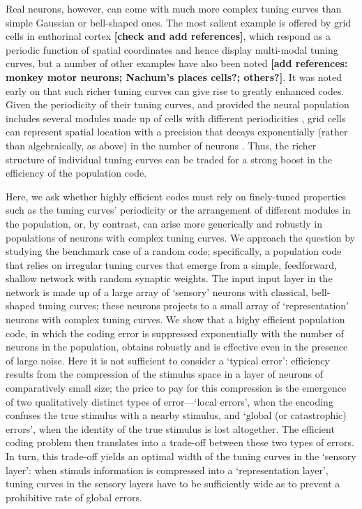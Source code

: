 \documentclass[a4paper]{article}%
\begin{document}
Real neurons, however, can come with much more complex tuning curves than
simple Gaussian or bell-shaped ones. The most salient example is offered by
grid cells in enthorinal cortex
\cite{Hafting2005MicrostructureCortex,Killian2012ACortex} \textbf{[check and
add references]}, which respond as a periodic function of spatial coordinates
and hence display multi-modal tuning curves, but a number of other examples
have also been noted \textbf{[add references: monkey motor neurons; Nachum's
places cells?; others?]}. It was noted early on that such richer tuning curves
can give rise to greatly enhanced codes. Given the periodicity of their tuning
curves, and provided the neural population includes several modules made up of
cells with different periodicities \cite{Fiete2008WhatLocation,Wei2015ACells},
grid cells can represent spatial location with a precision that decays
exponentially (rather than algebraically, as above) in the number of neurons
\cite{Sreenivasan2011GridComputation,Mathis2012ResolutionNeurons}. Thus, the
richer structure of individual tuning curves can be traded for a strong boost
in the efficiency of the population code.

Here, we ask whether highly efficient codes must rely on finely-tuned
properties such as the tuning curves' periodicity or the arrangement of
different modules in the population, or, by contrast, can arise more
generically and robustly in populations of neurons with complex tuning curves.
We approach the question by studying the benchmark case of a random code;
specifically, a population code that relies on irregular tuning curves that
emerge from a simple, feedforward, shallow network with random synaptic
weights. The input input layer in the network is made up of a large array of
`sensory' neurons with classical, bell-shaped tuning curves; these neurons
projects to a small array of `representation' neurons with complex tuning
curves. We show that a highy efficient population code, in which the coding
error is suppressed exponentially with the number of neurons in the
population, obtains robustly and is effective even in the presence of large
noise. Here it is not sufficient to consider a `typical error': efficiency
results from the compression of the stimulus space in a layer of neurons of
comparatively small size; the price to pay for this compression is the
emergence of two qualitatively distinct types of error---`local errors', when
the encoding confuses the true stimulus with a nearby stimulus, and `global
(or catastrophic) errors', when the identity of the true stimulus is lost
altogether. The efficient coding problem then translates into a trade-off
between these two types of errors. In turn, this trade-off yields an optimal
width of the tuning curves in the `sensory layer': when stimuls information is
compressed into a `representation layer', tuning curves in the sensory layers
have to be sufficiently wide as to prevent a prohibitive rate of global errors.
\end{document}
